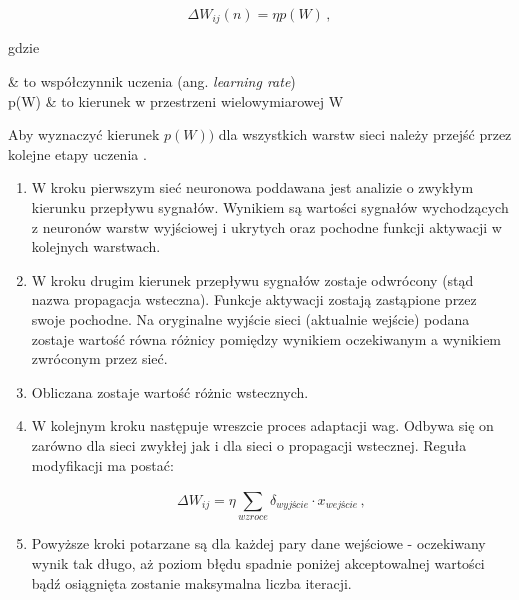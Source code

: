 \documentclass[twoside]{iisthesis}
\begin{document}
 		 
 		 \begin{equation}
 		 \label{eq:weightadaptation2}
 		 \Delta W_{ij}(n) = \eta p(W)
 		 \,,
 		 \end{equation}
		 
		 gdzie
		 
		 \begin{conditions*}
		 	\eta & to współczynnik uczenia (ang. \textit{learning rate}) \\
		 	p(W) & to kierunek w przestrzeni wielowymiarowej W 
		 \end{conditions*} 
		 
		 Aby wyznaczyć kierunek $p(W))$ dla wszystkich warstw sieci należy przejść przez kolejne etapy uczenia \cite{haykin1994neural}\cite{osowski1996sieci}\cite{kwateralgorytmy}\cite{hertz1993wstkep}\cite{timothy1996sieci}.
		 
		 \begin{enumerate}
		 	\item W kroku pierwszym sieć neuronowa poddawana jest analizie o zwykłym kierunku przepływu sygnałów. Wynikiem są wartości sygnałów wychodzących z neuronów warstw wyjściowej i ukrytych oraz pochodne funkcji aktywacji w kolejnych warstwach. 
		 	
		 	\item W kroku drugim kierunek przepływu sygnałów zostaje odwrócony (stąd nazwa propagacja wsteczna). Funkcje aktywacji zostają zastąpione przez swoje pochodne. Na oryginalne wyjście sieci (aktualnie wejście) podana zostaje wartość równa różnicy pomiędzy wynikiem oczekiwanym a wynikiem zwróconym przez sieć. 
		 	
		 	\item Obliczana zostaje wartość różnic wstecznych.
		 	
			\item W kolejnym kroku następuje wreszcie proces adaptacji wag. Odbywa się on zarówno dla sieci zwykłej jak i dla sieci o propagacji wstecznej. Reguła modyfikacji ma postać: 

			\begin{equation}
			\label{eq:weightadaptation4}
			\Delta W_{ij} = \eta \sum_{wzroce}^{} \delta_{wyjście} \cdot x_{wejście}
			\,,
			\end{equation}
			
			\item Powyższe kroki potarzane są dla każdej pary dane wejściowe - oczekiwany wynik tak długo, aż poziom błędu spadnie poniżej akceptowalnej wartości bądź osiągnięta zostanie maksymalna liczba iteracji. 

		 \end{enumerate}
				 
\end{document}
